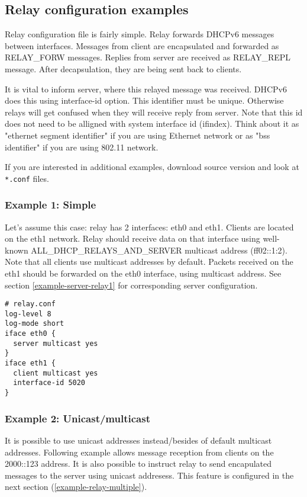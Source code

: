 \subsection{Relay configuration examples}
\label{example-relay}

Relay configuration file is fairly simple. Relay forwards DHCPv6
messages between interfaces. Messages from client are encapsulated and
forwarded as RELAY\_FORW messages. Replies from server are received as
RELAY\_REPL message. After decapsulation, they are being sent back to
clients. 

It is vital to inform server, where this relayed message was
received. DHCPv6 does this using interface-id option. This identifier
must be unique. Otherwise relays will get confused when they will
receive reply from server. Note that this id does not need to be
alligned with system interface id (ifindex). Think about it as
"ethernet segment identifier" if you are using Ethernet network or as
"bss identifier" if you are using 802.11 network.

If you are interested in additional examples, download source version
and look at \verb+*.conf+ files.

\subsubsection{Example 1: Simple}
\label{example-relay-1}
Let's assume this case: relay has 2 interfaces: eth0 and
eth1. Clients are located on the eth1 network. Relay should receive
data on that interface using well-known ALL\_DHCP\_RELAYS\_AND\_SERVER
multicast address (ff02::1:2). Note that all clients use multicast
addresses by default. Packets received on the eth1 should be
forwarded on the eth0 interface, using multicast address. See section
\ref{example-server-relay1} for corresponding server configuration.

\begin{lstlisting}
# relay.conf
log-level 8
log-mode short
iface eth0 {
  server multicast yes
}
iface eth1 {
  client multicast yes
  interface-id 5020
}
\end{lstlisting}

\subsubsection{Example 2: Unicast/multicast}
It is possible to use unicast addresses instead/besides of default
multicast addresses. Following example allows message reception from
clients on the 2000::123 address. It is also possible to instruct
relay to send encapulated messages to the server using unicast
addresess. This feature is configured in the next section
(\ref{example-relay-multiple}). 

